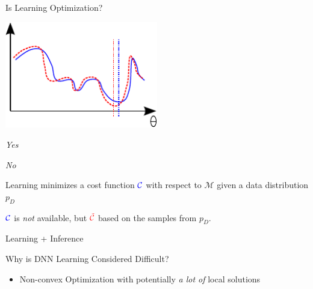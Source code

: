 \documentclass[first=dgreen,second=purple,logo=yellowexc]{aaltoslides}
\newcommand{\CC}[0]{\mathcal{C}}
\newcommand{\MM}[0]{\mathcal{M}}
\begin{document}
\begin{frame}{Is Learning Optimization?}

    \centering
    \includegraphics[width=0.5\textwidth]{cost_both.pdf}

    \begin{minipage}{0.48\textwidth}
    \emph{Yes}
    \end{minipage}
    \hfill
    \begin{minipage}{0.48\textwidth}
    \emph{No}
    \end{minipage}


    \begin{minipage}[t]{0.48\textwidth}
        \vspace{0pt}
    Learning minimizes a cost function $\color{blue}{\CC}$ with respect to
    $\MM$ given a data distribution $p_D$

    \end{minipage}
    \hfill
    \begin{minipage}[t]{0.48\textwidth}
        \vspace{0pt}
    $\color{blue}{\CC}$ is \emph{not} available, but $\color{red}{\tilde{\CC}}$ based
    on the samples from $p_D$.

    \end{minipage}

\end{frame}

\begin{frame}{Learning + Inference}

\end{frame}

\begin{frame}{Why is DNN Learning Considered Difficult?}

    \begin{itemize}
        \item Non-convex Optimization with potentially
            \emph{a lot of} local solutions
    \end{itemize}

\end{frame}
\end{document}
